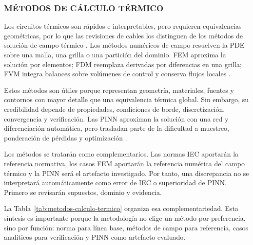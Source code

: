 \subsubsection{MÉTODOS DE CÁLCULO TÉRMICO}
\label{subsec:metodos-calculo-termico}

Los circuitos térmicos son rápidos e interpretables, pero requieren equivalencias geométricas, por lo que las revisiones de cables los distinguen de los métodos de solución de campo térmico \parencite[4--6]{enescu2021}. Los métodos numéricos de campo resuelven la PDE sobre una malla, una grilla o una partición del dominio. FEM aproxima la solución por elementos; FDM reemplaza derivadas por diferencias en una grilla; FVM integra balances sobre volúmenes de control y conserva flujos locales \parencites{patankar1980numerical}[3--4,93--99]{cigre2025}.

Estos métodos son útiles porque representan geometría, materiales, fuentes y contornos con mayor detalle que una equivalencia térmica global. Sin embargo, su credibilidad depende de propiedades, condiciones de borde, discretización, convergencia y verificación. Las PINN aproximan la solución con una red y diferenciación automática, pero trasladan parte de la dificultad a muestreo, ponderación de pérdidas y optimización \parencites[3--4,93--99]{cigre2025}[1--2,14--17]{lawal2022}.

Los métodos se tratarán como complementarios. Las normas IEC aportarán la referencia normativa, los casos FEM aportarán la referencia numérica del campo térmico y la PINN será el artefacto investigado. Por tanto, una discrepancia no se interpretará automáticamente como error de IEC o superioridad de PINN. Primero se revisarán supuestos, dominio y evidencia.

La Tabla~\ref{tab:metodos-calculo-termico} organiza esa complementariedad. Esta síntesis es importante porque la metodología no elige un método por preferencia, sino por función: norma para línea base, métodos de campo para referencia, casos analíticos para verificación y PINN como artefacto evaluado.

